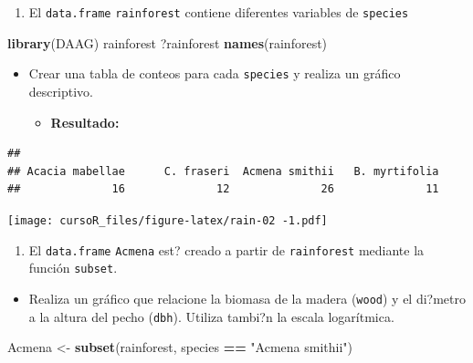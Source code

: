 \documentclass[]{book}
\newenvironment{Shaded}{\begin{snugshade}}{\end{snugshade}}
\newcommand{\KeywordTok}[1]{\textcolor[rgb]{0.13,0.29,0.53}{\textbf{#1}}}
\newcommand{\StringTok}[1]{\textcolor[rgb]{0.31,0.60,0.02}{#1}}
\newcommand{\OperatorTok}[1]{\textcolor[rgb]{0.81,0.36,0.00}{\textbf{#1}}}
\newcommand{\NormalTok}[1]{#1}
\providecommand{\tightlist}{%
  \setlength{\itemsep}{0pt}\setlength{\parskip}{0pt}}
\begin{document}
\begin{enumerate}
\def\labelenumi{\arabic{enumi}.}
\setcounter{enumi}{1}
\tightlist
\item
  El \texttt{data.frame} \texttt{rainforest} contiene diferentes
  variables de \texttt{species}
\end{enumerate}

\begin{Shaded}
\begin{Highlighting}[]
\KeywordTok{library}\NormalTok{(DAAG)}
\NormalTok{rainforest}
\NormalTok{?rainforest}
\KeywordTok{names}\NormalTok{(rainforest)}
\end{Highlighting}
\end{Shaded}

\begin{itemize}
\item
  Crear una tabla de conteos para cada \texttt{species} y realiza un
  gráfico descriptivo.

  \begin{itemize}
  \tightlist
  \item
    \textbf{Resultado:}
  \end{itemize}
\end{itemize}

\begin{verbatim}
## 
## Acacia mabellae      C. fraseri  Acmena smithii   B. myrtifolia 
##              16              12              26              11
\end{verbatim}

\texttt{[image: cursoR\_files/figure-latex/rain-02 -1.pdf]}

\begin{enumerate}
\def\labelenumi{\arabic{enumi}.}
\setcounter{enumi}{2}
\tightlist
\item
  El \texttt{data.frame} \texttt{Acmena} est? creado a partir de
  \texttt{rainforest} mediante la función \texttt{subset}.
\end{enumerate}

\begin{itemize}
\tightlist
\item
  Realiza un gráfico que relacione la biomasa de la madera
  (\texttt{wood}) y el di?metro a la altura del pecho (\texttt{dbh}).
  Utiliza tambi?n la escala logarítmica.
\end{itemize}

\begin{Shaded}
\begin{Highlighting}[]
\NormalTok{Acmena <-}\StringTok{ }\KeywordTok{subset}\NormalTok{(rainforest, species }\OperatorTok{==}\StringTok{ "Acmena smithii"}\NormalTok{)}
\end{Highlighting}
\end{Shaded}
\end{document}
